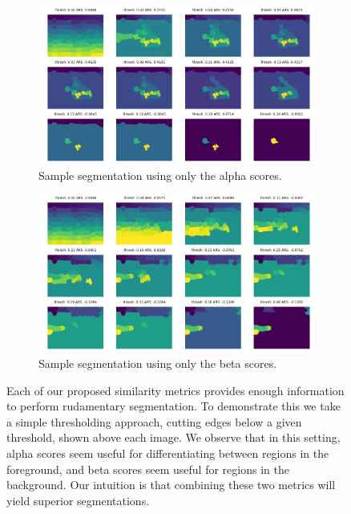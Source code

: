 \documentclass[twocolumn]{article}
\newcommand{\figlab}[1]{\label{fig:#1}}
\begin{document}
\begin{figure}[t]
  \centering

  \begin{subfigure}{0.4\linewidth}
    \includegraphics[width=\linewidth]{figs/only_alpha.png}
    \caption{Sample segmentation using only the alpha scores.}
  \end{subfigure}
  \begin{subfigure}{0.4\linewidth}
    \includegraphics[width=\linewidth]{figs/only_beta.png}
    \caption{Sample segmentation using only the beta scores.}
  \end{subfigure}

  \caption{
    Each of our proposed similarity metrics provides enough information to
    perform rudamentary segmentation. To demonstrate this we take a simple
    thresholding approach, cutting edges below a given threshold, shown above
    each image. 
    We observe that in this setting, alpha scores seem useful for
    differentiating between regions in the foreground, and beta scores seem
    useful for regions in the background. Our intuition is that combining these
    two metrics will yield superior segmentations.
  }
  \figlab{ab_only}

\end{figure}
\end{document}
